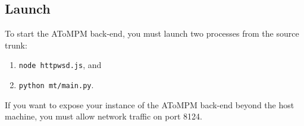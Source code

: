 \documentclass{article}
\numberwithin{equation}{section}
\numberwithin{figure}{section}
\begin{document}
\subsection{Launch}
To start the AToMPM back-end, you must launch two processes from the source trunk:
\begin{enumerate}
	\item \texttt{node httpwsd.js}, and
	\item \texttt{python mt/main.py}.\\
\end{enumerate}

If you want to expose your instance of the AToMPM back-end beyond the host machine, you must allow network traffic on port 8124.
\end{document}
